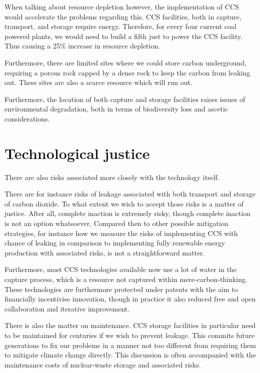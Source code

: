 \documentclass[12pt]{report}
\begin{document}
When talking about resource depletion however, the implementation of CCS would
accelerate the problems regarding this. CCS facilities, both in capture,
transport, and storage require energy. Therefore, for every four current coal
powered plants, we would need to build a fifth just to power the CCS facility.
Thus causing a 25\% increase in resource depletion.

Furthermore, there are limited sites where we could store carbon underground,
requiring a porous rock capped by a dense rock to keep the carbon from leaking
out. These sites are also a scarce resource which will run out.

Furthermore, the location of both capture and storage facilities raises issues
of environmental degradation, both in terms of biodiversity loss and ascetic
considerations.

\section{Technological justice}

There are also risks associated more closely with the technology itself.

There are for instance risks of leakage associated with both transport and
storage of carbon dioxide. To what extent we wish to accept those risks is a
matter of justice. After all, complete inaction is extremely risky, though
complete inaction is not an option whatsoever. Compared then to other possible
mitigation strategies, for instance how we measure the risks of implementing CCS
with chance of leaking in comparison to implementing fully renewable energy
production with associated risks, is not a straightforward matter.

Furthermore, most CCS technologies available now use a lot of water in the
capture process, which is a resource not captured within mere-carbon-thinking.
These technologies are furthermore protected under patents with the aim to
financially incentivise innovation, though in practice it also reduced free and
open collaboration and iterative improvement.

There is also the matter on maintenance. CCS storage facilities in particular
need to be maintained for centuries if we wish to prevent leakage. This commits
future generations to fix our problems in a manner not too different from
requiring them to mitigate climate change directly. This discussion is often
accompanied with the maintenance costs of nuclear-waste storage and associated
risks.
\end{document}
